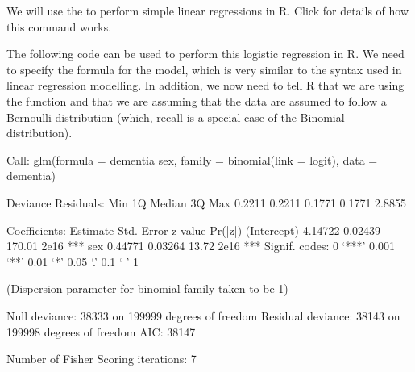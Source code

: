 \documentclass[letterpaper,10pt,english]{jupyterBook}
\begin{document}
\sphinxAtStartPar
We will use the  to perform simple linear regressions in R. Click  for details of how this command works.

\sphinxAtStartPar
The following code can be used to perform this logistic regression in R. We need to specify the formula for the model, which is very similar to the syntax used in linear regression modelling. In addition, we now need to tell R that we are using the  function and that we are assuming that the data are assumed to follow a Bernoulli distribution (which, recall is a special case of the Binomial distribution).

\begin{sphinxVerbatim}[commandchars=\\\{\}]
  
          
\end{sphinxVerbatim}

\begin{sphinxVerbatim}[commandchars=\\\{\}]
Call:
glm(formula = dementia \PYGZti{} sex, family = binomial(link = \PYGZdq{}logit\PYGZdq{}), 
    data = dementia)

Deviance Residuals: 
    Min       1Q   Median       3Q      Max  
\PYGZhy{}0.2211  \PYGZhy{}0.2211  \PYGZhy{}0.1771  \PYGZhy{}0.1771   2.8855  

Coefficients:
            Estimate Std. Error z value Pr(\PYGZgt{}|z|)    
(Intercept) \PYGZhy{}4.14722    0.02439 \PYGZhy{}170.01   \PYGZlt{}2e\PYGZhy{}16 ***
sex          0.44771    0.03264   13.72   \PYGZlt{}2e\PYGZhy{}16 ***
\PYGZhy{}\PYGZhy{}\PYGZhy{}
Signif. codes:  0 ‘***’ 0.001 ‘**’ 0.01 ‘*’ 0.05 ‘.’ 0.1 ‘ ’ 1

(Dispersion parameter for binomial family taken to be 1)

    Null deviance: 38333  on 199999  degrees of freedom
Residual deviance: 38143  on 199998  degrees of freedom
AIC: 38147

Number of Fisher Scoring iterations: 7
\end{sphinxVerbatim}
\end{document}
